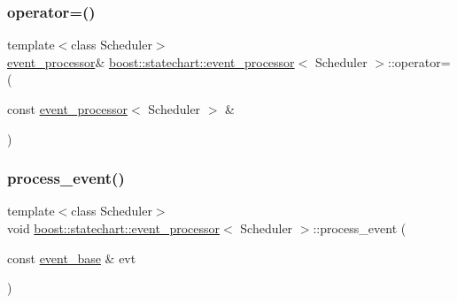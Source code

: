 \subsubsection{\texorpdfstring{operator=()}{operator=()}}
{\footnotesize\ttfamily template$<$class Scheduler$>$ \\
\mbox{\hyperlink{classboost_1_1statechart_1_1event__processor}{event\+\_\+processor}}\& \mbox{\hyperlink{classboost_1_1statechart_1_1event__processor}{boost\+::statechart\+::event\+\_\+processor}}$<$ Scheduler $>$\+::operator= (\begin{DoxyParamCaption}\item[{const \mbox{\hyperlink{classboost_1_1statechart_1_1event__processor}{event\+\_\+processor}}$<$ Scheduler $>$ \&}]{ }\end{DoxyParamCaption})\hspace{0.3cm}{\ttfamily [private]}}

\mbox{\label{classboost_1_1statechart_1_1event__processor_aa3ce5ebe4415e8fac525a34aaa0eee1d}} 
\subsubsection{\texorpdfstring{process\+\_\+event()}{process\_event()}}
{\footnotesize\ttfamily template$<$class Scheduler$>$ \\
void \mbox{\hyperlink{classboost_1_1statechart_1_1event__processor}{boost\+::statechart\+::event\+\_\+processor}}$<$ Scheduler $>$\+::process\+\_\+event (\begin{DoxyParamCaption}\item[{const \mbox{\hyperlink{classboost_1_1statechart_1_1event__base}{event\+\_\+base}} \&}]{evt }\end{DoxyParamCaption})\hspace{0.3cm}{\ttfamily [inline]}}

\mbox{\label{classboost_1_1statechart_1_1event__processor_a5db03beb4d6c1545e7bb9584cd60b500}} 
